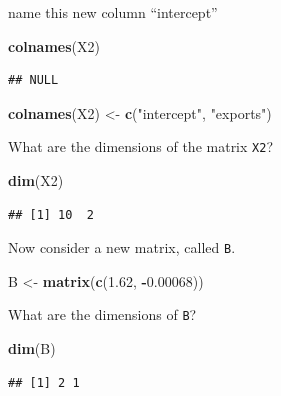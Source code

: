 \documentclass[]{book}
\newenvironment{Shaded}{\begin{snugshade}}{\end{snugshade}}
\newcommand{\KeywordTok}[1]{\textcolor[rgb]{0.13,0.29,0.53}{\textbf{#1}}}
\newcommand{\FloatTok}[1]{\textcolor[rgb]{0.00,0.00,0.81}{#1}}
\newcommand{\StringTok}[1]{\textcolor[rgb]{0.31,0.60,0.02}{#1}}
\newcommand{\OperatorTok}[1]{\textcolor[rgb]{0.81,0.36,0.00}{\textbf{#1}}}
\newcommand{\NormalTok}[1]{#1}
\theoremstyle{definition}
\theoremstyle{definition}
\theoremstyle{definition}
\theoremstyle{remark}
\begin{document}
name this new column ``intercept''

\begin{Shaded}
\begin{Highlighting}[]
\KeywordTok{colnames}\NormalTok{(X2)}
\end{Highlighting}
\end{Shaded}

\begin{verbatim}
## NULL
\end{verbatim}

\begin{Shaded}
\begin{Highlighting}[]
\KeywordTok{colnames}\NormalTok{(X2) <-}\StringTok{ }\KeywordTok{c}\NormalTok{(}\StringTok{"intercept"}\NormalTok{, }\StringTok{"exports"}\NormalTok{)}
\end{Highlighting}
\end{Shaded}

What are the dimensions of the matrix \texttt{X2}?

\begin{Shaded}
\begin{Highlighting}[]
\KeywordTok{dim}\NormalTok{(X2)}
\end{Highlighting}
\end{Shaded}

\begin{verbatim}
## [1] 10  2
\end{verbatim}

Now consider a new matrix, called \texttt{B}.

\begin{Shaded}
\begin{Highlighting}[]
\NormalTok{B <-}\StringTok{ }\KeywordTok{matrix}\NormalTok{(}\KeywordTok{c}\NormalTok{(}\FloatTok{1.62}\NormalTok{, }\OperatorTok{-}\FloatTok{0.00068}\NormalTok{))}
\end{Highlighting}
\end{Shaded}

What are the dimensions of \texttt{B}?

\begin{Shaded}
\begin{Highlighting}[]
\KeywordTok{dim}\NormalTok{(B)}
\end{Highlighting}
\end{Shaded}

\begin{verbatim}
## [1] 2 1
\end{verbatim}
\end{document}

